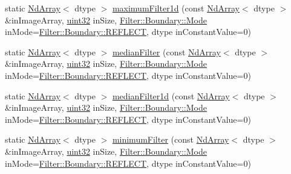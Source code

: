 \begin{DoxyCompactItemize}
\item 
static \mbox{\hyperlink{class_num_cpp_1_1_nd_array}{Nd\+Array}}$<$ dtype $>$ \mbox{\hyperlink{class_num_cpp_1_1_filters_a6c52468ff9d827a98dcb02246213fde8}{maximum\+Filter1d}} (const \mbox{\hyperlink{class_num_cpp_1_1_nd_array}{Nd\+Array}}$<$ dtype $>$ \&in\+Image\+Array, \mbox{\hyperlink{namespace_num_cpp_a36f388e948380413c63011cab9b7fbd5}{uint32}} in\+Size, \mbox{\hyperlink{struct_num_cpp_1_1_filter_1_1_boundary_a3fb520b67d524104db12ceef41adf081}{Filter\+::\+Boundary\+::\+Mode}} in\+Mode=\mbox{\hyperlink{struct_num_cpp_1_1_filter_1_1_boundary_a3fb520b67d524104db12ceef41adf081ad0d71a6dafb7ae1e96441e3f9f7aced8}{Filter\+::\+Boundary\+::\+R\+E\+F\+L\+E\+CT}}, dtype in\+Constant\+Value=0)
\item 
static \mbox{\hyperlink{class_num_cpp_1_1_nd_array}{Nd\+Array}}$<$ dtype $>$ \mbox{\hyperlink{class_num_cpp_1_1_filters_a9a1db9fe2ea9457d87f22ec41f93b42f}{median\+Filter}} (const \mbox{\hyperlink{class_num_cpp_1_1_nd_array}{Nd\+Array}}$<$ dtype $>$ \&in\+Image\+Array, \mbox{\hyperlink{namespace_num_cpp_a36f388e948380413c63011cab9b7fbd5}{uint32}} in\+Size, \mbox{\hyperlink{struct_num_cpp_1_1_filter_1_1_boundary_a3fb520b67d524104db12ceef41adf081}{Filter\+::\+Boundary\+::\+Mode}} in\+Mode=\mbox{\hyperlink{struct_num_cpp_1_1_filter_1_1_boundary_a3fb520b67d524104db12ceef41adf081ad0d71a6dafb7ae1e96441e3f9f7aced8}{Filter\+::\+Boundary\+::\+R\+E\+F\+L\+E\+CT}}, dtype in\+Constant\+Value=0)
\item 
static \mbox{\hyperlink{class_num_cpp_1_1_nd_array}{Nd\+Array}}$<$ dtype $>$ \mbox{\hyperlink{class_num_cpp_1_1_filters_a74a21b9101a1861aebce8e1c46746b5a}{median\+Filter1d}} (const \mbox{\hyperlink{class_num_cpp_1_1_nd_array}{Nd\+Array}}$<$ dtype $>$ \&in\+Image\+Array, \mbox{\hyperlink{namespace_num_cpp_a36f388e948380413c63011cab9b7fbd5}{uint32}} in\+Size, \mbox{\hyperlink{struct_num_cpp_1_1_filter_1_1_boundary_a3fb520b67d524104db12ceef41adf081}{Filter\+::\+Boundary\+::\+Mode}} in\+Mode=\mbox{\hyperlink{struct_num_cpp_1_1_filter_1_1_boundary_a3fb520b67d524104db12ceef41adf081ad0d71a6dafb7ae1e96441e3f9f7aced8}{Filter\+::\+Boundary\+::\+R\+E\+F\+L\+E\+CT}}, dtype in\+Constant\+Value=0)
\item 
static \mbox{\hyperlink{class_num_cpp_1_1_nd_array}{Nd\+Array}}$<$ dtype $>$ \mbox{\hyperlink{class_num_cpp_1_1_filters_a274b8b1cf4fd0a5b97716f3c6b1ddecb}{minimum\+Filter}} (const \mbox{\hyperlink{class_num_cpp_1_1_nd_array}{Nd\+Array}}$<$ dtype $>$ \&in\+Image\+Array, \mbox{\hyperlink{namespace_num_cpp_a36f388e948380413c63011cab9b7fbd5}{uint32}} in\+Size, \mbox{\hyperlink{struct_num_cpp_1_1_filter_1_1_boundary_a3fb520b67d524104db12ceef41adf081}{Filter\+::\+Boundary\+::\+Mode}} in\+Mode=\mbox{\hyperlink{struct_num_cpp_1_1_filter_1_1_boundary_a3fb520b67d524104db12ceef41adf081ad0d71a6dafb7ae1e96441e3f9f7aced8}{Filter\+::\+Boundary\+::\+R\+E\+F\+L\+E\+CT}}, dtype in\+Constant\+Value=0)

\end{DoxyCompactItemize}
